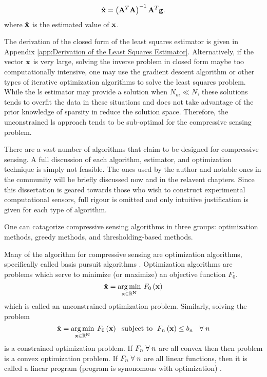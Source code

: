\begin{equation}
	\hat{ \mathbf{x} } = \left( \mathbf{A}^T \mathbf{A} \right)^{-1} \mathbf{A}^T \mathbf{g}.
\end{equation}
where $\hat{ \mathbf{x} }$ is the estimated value of $\mathbf{x}$.

The derivation of the closed form of the least squares estimator is given in Appendix \ref{app:Derivation of the Least Squares Estimator}. Alternatively, if the vector $\mathbf{x}$ is very large, solving the inverse problem in closed form maybe too computationally intensive, one may use the gradient descent algorithm or other types of iterative optimization algorithms to solve the least squares problem. While the \gls{ls} estimator may provide a solution when $N_m \ll N$, these solutions tends to overfit the data in these situations and does not take advantage of the prior knowledge of sparsity in reduce the solution space. Therefore, the unconstrained \gls{ls} approach tends to be sub-optimal for the compressive sensing problem.

There are a vast number of algorithms that claim to be designed for compressive sensing. A full discussion of each algorithm, estimator, and optimization technique is simply not feasible. The ones used by the author and notable ones in the community will be briefly discussed now and in the relavent chapters. Since this dissertation is geared towards those who wish to construct experimental computational sensors, full rigour is omitted and only intuitive justification is given for each type of algorithm.

One can catagorize compressive sensing algorithms in three groups: optimization methods, greedy methods, and thresholding-based methods. 

Many of the algorithm for compressive sensing are optimization algorithms, specifically called \gls{basis pursuit} algorithms  \cite{foucart2013mathematical}. Optimization algorithms are problems which serve to minimize (or maximize) an objective function $F_0$.
\begin{equation}
	\hat{ \mathbf{x} } = \operatorname*{arg\,min}_{\mathbf{x \in \mathbb{R}^N }} \: F_0 \left( \mathbf{x} \right)
\end{equation}
which is called an unconstrained optimization problem. Similarly, solving the problem
\begin{equation}
	\hat{ \mathbf{x} } = \operatorname*{arg\,min}_{\mathbf{x \in \mathbb{R}^N }} \: F_0 \left( \mathbf{x} \right) \text{\; subject to \;} F_n \left( \mathbf{x} \right) \leq b_n \text{\; \;}\forall \text{\;} n
\end{equation}
is a constrained optimization problem. If $F_n \text{\;}\forall \text{\;} n$ are all convex then then problem is a convex optimization problem. If  $F_n \text{\;}\forall \text{\;}n$ are all linear functions, then it is called a linear program (program is synonomous with optimization) \cite{foucart2013mathematical}.

